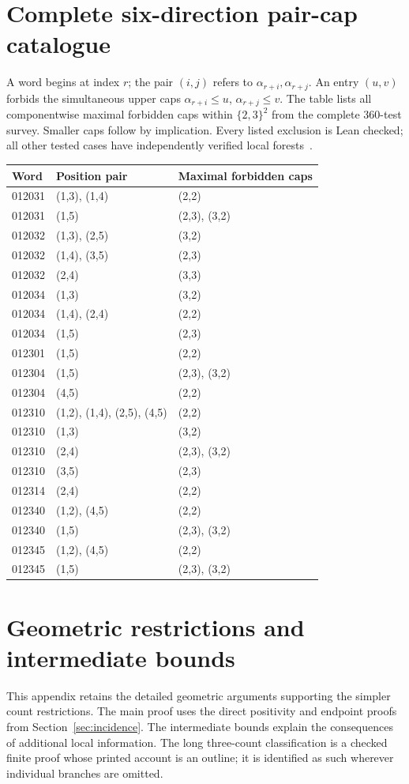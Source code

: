 \documentclass[11pt,a4paper]{article}
\theoremstyle{definition}
\theoremstyle{remark}
\begin{document}
\section{Complete six-direction pair-cap catalogue}\label{app:pair-caps}
A word begins at index $r$; the pair $(i,j)$ refers to $\alpha_{r+i},\alpha_{r+j}$. An entry $(u,v)$ forbids the simultaneous upper caps $\alpha_{r+i}\le u$, $\alpha_{r+j}\le v$. The table lists all componentwise maximal forbidden caps within $\{2,3\}^2$ from the complete 360-test survey. Smaller caps follow by implication. Every listed exclusion is Lean checked; all other tested cases have independently verified local forests~\cite{recentarchive}.
\begin{longtable}{lll}
\toprule Word & Position pair & Maximal forbidden caps\\\midrule\endhead
012031&(1,3), (1,4)&(2,2)\\
012031&(1,5)&(2,3), (3,2)\\
012032&(1,3), (2,5)&(3,2)\\
012032&(1,4), (3,5)&(2,3)\\
012032&(2,4)&(3,3)\\
012034&(1,3)&(3,2)\\
012034&(1,4), (2,4)&(2,2)\\
012034&(1,5)&(2,3)\\
012301&(1,5)&(2,2)\\
012304&(1,5)&(2,3), (3,2)\\
012304&(4,5)&(2,2)\\
012310&(1,2), (1,4), (2,5), (4,5)&(2,2)\\
012310&(1,3)&(3,2)\\
012310&(2,4)&(2,3), (3,2)\\
012310&(3,5)&(2,3)\\
012314&(2,4)&(2,2)\\
012340&(1,2), (4,5)&(2,2)\\
012340&(1,5)&(2,3), (3,2)\\
012345&(1,2), (4,5)&(2,2)\\
012345&(1,5)&(2,3), (3,2)\\\bottomrule
\end{longtable}

\section{Geometric restrictions and intermediate bounds}\label{app:geometry}
This appendix retains the detailed geometric arguments supporting the simpler count restrictions. The main proof uses the direct positivity and endpoint proofs from Section~\ref{sec:incidence}. The intermediate bounds explain the consequences of additional local information. The long three-count classification is a checked finite proof whose printed account is an outline; it is identified as such wherever individual branches are omitted.
\end{document}
